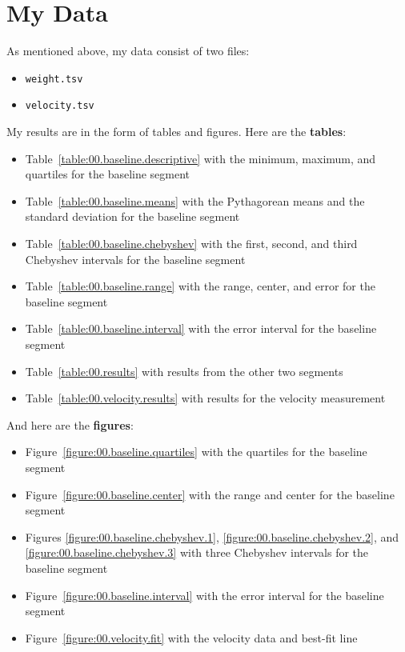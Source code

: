 \section{My Data}
%
As mentioned above, my data consist of two files:
\begin{itemize}
    \item \texttt{weight.tsv}
    \item \texttt{velocity.tsv}
\end{itemize}
My results are in the form of tables and figures. Here are the \textbf{tables}:
\begin{itemize}
    \item Table~\ref{table:00.baseline.descriptive} with the minimum, maximum, and quartiles for the baseline segment
    \item Table~\ref{table:00.baseline.means} with the Pythagorean means and the standard deviation for the baseline segment
    \item Table~\ref{table:00.baseline.chebyshev} with the first, second, and third Chebyshev intervals for the baseline segment
    \item Table~\ref{table:00.baseline.range} with the range, center, and error for the baseline segment
    \item Table~\ref{table:00.baseline.interval} with the error interval for the baseline segment
    \item Table~\ref{table:00.results} with results from the other two segments
    \item Table~\ref{table:00.velocity.results} with results for the velocity measurement
\end{itemize}
And here are the \textbf{figures}:
\begin{itemize}
    \item Figure~\ref{figure:00.baseline.quartiles} with the quartiles for the baseline segment
    \item Figure~\ref{figure:00.baseline.center} with the range and center for the baseline segment
    \item Figures \ref{figure:00.baseline.chebyshev.1}, \ref{figure:00.baseline.chebyshev.2}, and \ref{figure:00.baseline.chebyshev.3} with three Chebyshev intervals for the baseline segment
    \item Figure~\ref{figure:00.baseline.interval} with the error interval for the baseline segment
    \item Figure~\ref{figure:00.velocity.fit} with the velocity data and best-fit line
\end{itemize}
